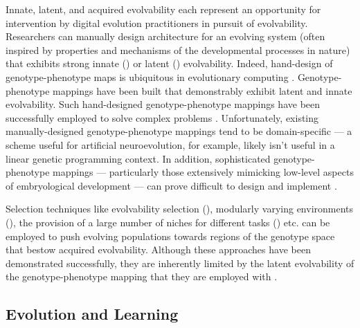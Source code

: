 Innate, latent, and acquired evolvability each represent an opportunity for intervention by digital evolution practitioners in pursuit of evolvability.
Researchers can manually design architecture for an evolving system (often inspired by properties and mechanisms of the developmental processes in nature) that exhibits strong innate (\cite{clune2011performance}) or latent (\cite{reisinger2005towards}) evolvability.
Indeed, hand-design of genotype-phenotype maps is ubiquitous in evolutionary computing \cite{wagner1996perspective}.
Genotype-phenotype mappings have been built that demonstrably exhibit latent \cite{reisinger2007acquiring} and innate \cite{stanley2009hypercube, clune2011performance} evolvability.
Such hand-designed genotype-phenotype mappings have been successfully employed to solve complex problems \cite{woolley2010evolving, cheney2013unshackling}.
Unfortunately, existing manually-designed genotype-phenotype mappings tend to be domain-specific --- a scheme useful for artificial neuroevolution, for example, likely isn't useful in a linear genetic programming context.
In addition, sophisticated genotype-phenotype mappings --- particularly those extensively mimicking low-level aspects of embryological development --- can prove difficult to design and implement \cite[p 223]{downing2015intelligence}.

Selection techniques like evolvability selection (\cite{mengistu2016evolvability}), modularly varying environments (\cite{kashtan2005spontaneous}), the provision of a large number of niches for different tasks (\cite{nguyen2015innovation}) etc. can be employed to push evolving populations towards regions of the genotype space that bestow acquired evolvability.
Although these approaches have been demonstrated successfully, they are inherently limited by the latent evolvability of the genotype-phenotype mapping that they are employed with \cite{reisinger2005towards}.

\subsection{Evolution and Learning}

